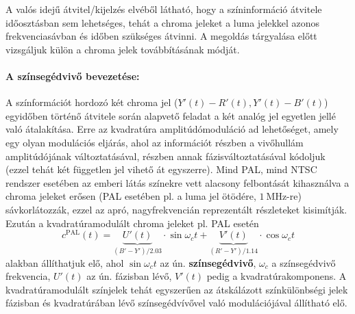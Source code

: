 A valós idejű átvitel/kijelzés elvéből látható, hogy a színinformáció átvitele időosztásban sem lehetséges, tehát a chroma jeleket a luma jelekkel azonos frekvenciasávban és időben szükséges átvinni.
A megoldás tárgyalása előtt vizsgáljuk külön a chroma jelek továbbításának módját.

\paragraph{A színsegédvivő bevezetése:}
A színformációt hordozó két chroma jel ($Y'(t)-R'(t), Y'(t)-B'(t)$) egyidőben történő átvitele során alapvető feladat a két analóg jel egyetlen jellé való átalakítása.
Erre az kvadratúra amplitúdómoduláció ad lehetőséget, amely egy olyan modulációs eljárás, ahol az információt részben a vivőhullám amplitúdójának változtatásával, részben annak fázisváltoztatásával kódoljuk (ezzel tehát két független jel vihető át egyszerre). 
Mind PAL, mind NTSC rendszer esetében az emberi látás színekre vett alacsony felbontását kihasználva a chroma jeleket erősen (PAL esetében pl. a luma jel ötödére, $1~\mathrm{MHz}$-re) sávkorlátozzák, ezzel az apró, nagyfrekvencián reprezentált részleteket kisimítják. 
Ezután a kvadratúramodulált chroma jeleket pl. PAL esetén
\begin{equation}
c^{\mathrm{PAL}}(t) = \underbrace{U'(t)}_{\left( B'- Y'\right) / 2.03} \cdot \sin \omega_c t + \underbrace{V'(t)}_{\left( R'- Y'\right) / 1.14}  \cdot \cos \omega_c t
\label{Eq:PAL_cr}
\end{equation}
alakban állíthatjuk elő, ahol $\sin \omega_c t$ az ún. \textbf{színsegédvivő}, $\omega_c$ a színsegédvivő frekvencia, $U'(t)$ az ún. fázisban lévő, $V'(t)$ pedig a kvadratúrakomponens.
A kvadratúramodulált színjelek tehát egyszerűen az átskálázott színkülönbségi jelek fázisban és kvadratúrában lévő színsegédvívővel való modulációjával állítható elő.

